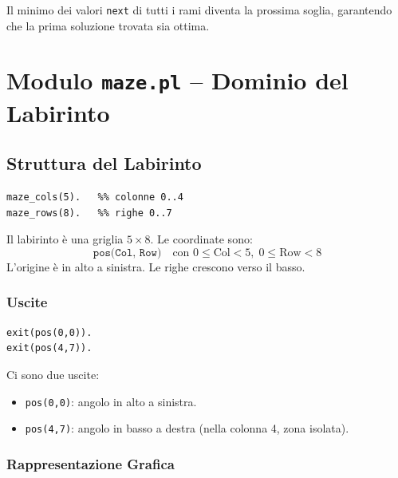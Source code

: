 \documentclass[12pt,a4paper]{article}
\begin{document}
\noindent Il minimo dei valori \texttt{next} di tutti i rami diventa la prossima
soglia, garantendo che la prima soluzione trovata sia ottima.

\section{Modulo \texttt{maze.pl} -- Dominio del Labirinto}

\subsection{Struttura del Labirinto}

\begin{lstlisting}
maze_cols(5).   %% colonne 0..4
maze_rows(8).   %% righe 0..7
\end{lstlisting}

Il labirinto è una griglia $5 \times 8$. Le coordinate sono:
\[
  \texttt{pos(Col, Row)} \quad \text{con } 0 \le \text{Col} < 5,\; 0 \le \text{Row} < 8
\]
L'origine è in alto a sinistra. Le righe crescono verso il basso.

\subsubsection{Uscite}

\begin{lstlisting}
exit(pos(0,0)).
exit(pos(4,7)).
\end{lstlisting}

Ci sono due uscite:
\begin{itemize}[noitemsep]
  \item \texttt{pos(0,0)}: angolo in alto a sinistra.
  \item \texttt{pos(4,7)}: angolo in basso a destra (nella colonna 4, zona isolata).
\end{itemize}

\subsubsection{Rappresentazione Grafica}
\end{document}
